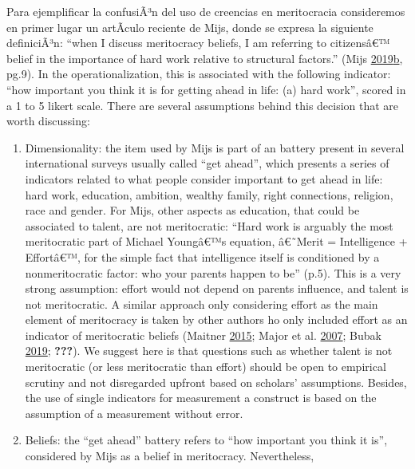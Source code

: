 \documentclass[
]{article}
\begin{document}
Para ejemplificar la confusiÃ³n del uso de creencias en meritocracia
consideremos en primer lugar un artÃ­culo reciente de Mijs, donde se
expresa la siguiente definiciÃ³n: ``when I discuss meritocracy beliefs,
I am referring to citizensâ€™ belief in the importance of hard work
relative to structural factors.'' (Mijs
\protect\hyperlink{ref-mijs_paradox_2019}{2019}\protect\hyperlink{ref-mijs_paradox_2019}{b},
pg.9). In the operationalization, this is associated with the following
indicator: ``how important you think it is for getting ahead in life:
(a) hard work'', scored in a 1 to 5 likert scale. There are several
assumptions behind this decision that are worth discussing:

\begin{enumerate}
\def\labelenumi{\alph{enumi}.}
\item
  Dimensionality: the item used by Mijs is part of an battery present in
  several international surveys usually called ``get ahead'', which
  presents a series of indicators related to what people consider
  important to get ahead in life: hard work, education, ambition,
  wealthy family, right connections, religion, race and gender. For
  Mijs, other aspects as education, that could be associated to talent,
  are not meritocratic: ``Hard work is arguably the most meritocratic
  part of Michael Youngâ€™s equation, â€˜Merit = Intelligence +
  Effortâ€™, for the simple fact that intelligence itself is conditioned
  by a nonmeritocratic factor: who your parents happen to be'' (p.5).
  This is a very strong assumption: effort would not depend on parents
  influence, and talent is not meritocratic. A similar approach only
  considering effort as the main element of meritocracy is taken by
  other authors ho only included effort as an indicator of meritocratic
  beliefs (Maitner
  \protect\hyperlink{ref-MaitnerEmotionalreactionsunequal2015}{2015};
  Major et al.
  \protect\hyperlink{ref-MajorPerceiveddiscriminationworldview2007}{2007};
  Bubak
  \protect\hyperlink{ref-BubakPerceptionsmeritocracynote2019}{2019};
  {\textbf{???}}). We suggest here is that questions such as whether
  talent is not meritocratic (or less meritocratic than effort) should
  be open to empirical scrutiny and not disregarded upfront based on
  scholars' assumptions. Besides, the use of single indicators for
  measurement a construct is based on the assumption of a measurement
  without error.
\item
  Beliefs: the ``get ahead'' battery refers to ``how important you think
  it is'', considered by Mijs as a belief in meritocracy. Nevertheless,

\end{enumerate}
\end{document}
